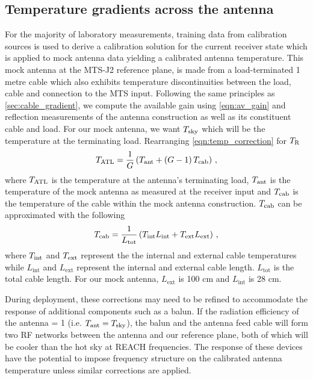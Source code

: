 \subsection{Temperature gradients across the antenna}\label{sec:ant_corrections}
For the majority of laboratory measurements, training data from calibration sources is used to derive a calibration solution for the current receiver state which is applied to mock antenna data yielding a calibrated antenna temperature. This mock antenna at the MTS-J2 reference plane, is made from a load-terminated 1 metre cable which also exhibits temperature discontinuities between the load, cable and connection to the MTS input. Following the same principles as \cref{sec:cable_gradient}, we compute the available gain using \cref{eqn:av_gain} and reflection measurements of the antenna construction as well as its constituent cable and load. For our mock antenna, we want $T_{\mathrm{sky}}$ which will be the temperature at the terminating load. Rearranging \cref{eqn:temp_correction} for $T_{\mathrm{R}}$
\begin{equation}
    T_{\mathrm{ATL}} = \frac{1}{G} \left( T_{\mathrm{ant}} + \left( G - 1 \right) T_{\mathrm{cab}} \right) \,,
\end{equation}
where $T_{\mathrm{ATL}}$ is the temperature at the antenna’s terminating load, $T_{\mathrm{ant}}$ is the temperature of the mock antenna as measured at the receiver input and $T_{\mathrm{cab}}$ is the temperature of the cable within the mock antenna construction. $T_{\mathrm{cab}}$ can be approximated with the following
\begin{equation}
    T_{\mathrm{cab}} = \frac{1}{L_{\mathrm{tot}}} \left( T_{\mathrm{int}}L_{\mathrm{int}} + T_{\mathrm{ext}}L_{\mathrm{ext}} \right) \,,
\end{equation}
where $T_{\mathrm{int}}$ and $T_{\mathrm{ext}}$ represent the the internal and external cable temperatures while $L_{\mathrm{int}}$ and $L_{\mathrm{ext}}$ represent the internal and external cable length. $L_{\mathrm{tot}}$ is the total cable length. For our mock antenna, $L_{\mathrm{ext}}$ is 100 cm and $L_{\mathrm{int}}$ is 28 cm.

During deployment, these corrections may need to be refined to accommodate the response of additional components such as a balun. If the radiation efficiency of the antenna = 1 (i.e. $T_{\mathrm{ant}}=T_{\mathrm{sky}}$), the balun and the antenna feed cable will form two RF networks between the antenna and our reference plane, both of which will be cooler than the hot sky at REACH frequencies. The response of these devices have the potential to impose frequency structure on the calibrated antenna temperature unless similar corrections are applied.

